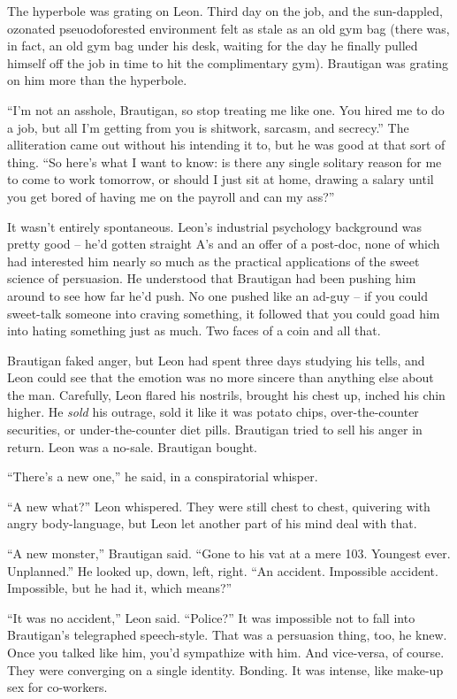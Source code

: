 The hyperbole was grating on Leon. Third day on the job, and the 
sun-dappled, ozonated pseuodoforested environment felt as stale as an 
old gym bag (there was, in fact, an old gym bag under his desk, waiting 
for the day he finally pulled himself off the job in time to hit the 
complimentary gym). Brautigan was grating on him more than the 
hyperbole.

“I'm not an asshole, Brautigan, so stop treating me like one. You 
hired me to do a job, but all I'm getting from you is shitwork, 
sarcasm, and secrecy.” The alliteration came out without his 
intending it to, but he was good at that sort of thing. “So here's 
what I want to know: is there any single solitary reason for me to come 
to work tomorrow, or should I just sit at home, drawing a salary until 
you get bored of having me on the payroll and can my ass?”

It wasn't entirely spontaneous. Leon's industrial psychology background 
was pretty good -- he'd gotten straight A's and an offer of a post-doc, 
none of which had interested him nearly so much as the practical 
applications of the sweet science of persuasion. He understood that 
Brautigan had been pushing him around to see how far he'd push. No one 
pushed like an ad-guy -- if you could sweet-talk someone into craving 
something, it followed that you could goad him into hating something 
just as much. Two faces of a coin and all that.

Brautigan faked anger, but Leon had spent three days studying his 
tells, and Leon could see that the emotion was no more sincere than 
anything else about the man. Carefully, Leon flared his nostrils, 
brought his chest up, inched his chin higher. He \emph{sold} his 
outrage, sold it like it was potato chips, over-the-counter securities, 
or under-the-counter diet pills. Brautigan tried to sell his anger in 
return. Leon was a no-sale. Brautigan bought.

“There's a new one,” he said, in a conspiratorial whisper.

“A new what?” Leon whispered. They were still chest to chest, 
quivering with angry body-language, but Leon let another part of his 
mind deal with that.

“A new monster,” Brautigan said. “Gone to his vat at a mere 103. 
Youngest ever. Unplanned.” He looked up, down, left, right. “An 
accident. Impossible accident. Impossible, but he had it, which 
means?”

“It was no accident,” Leon said. “Police?” It was impossible 
not to fall into Brautigan's telegraphed speech-style. That was a 
persuasion thing, too, he knew. Once you talked like him, you'd 
sympathize with him. And vice-versa, of course. They were converging on 
a single identity. Bonding. It was intense, like make-up sex for 
co-workers.

